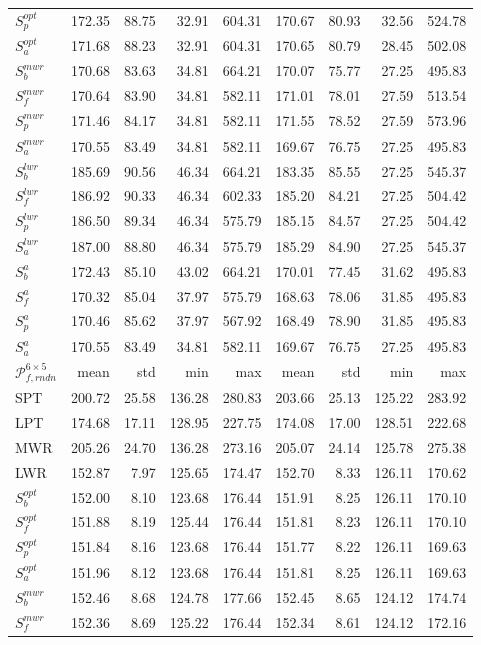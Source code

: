 {\begin{table}
{\begin{tabular}{|l|rrrr|rrrr|}
$S^{opt}_p$ &172.35&88.75&32.91&604.31&170.67&80.93&32.56&524.78\\
$S^{opt}_a$ &171.68&88.23&32.91&604.31&170.65&80.79&28.45&502.08\\
$S^{mwr}_b$ &170.68&83.63&34.81&664.21&170.07&75.77&27.25&495.83\\
$S^{mwr}_f$ &170.64&83.90&34.81&582.11&171.01&78.01&27.59&513.54\\
$S^{mwr}_p$ &171.46&84.17&34.81&582.11&171.55&78.52&27.59&573.96\\
$S^{mwr}_a$ &170.55&83.49&34.81&582.11&169.67&76.75&27.25&495.83\\
$S^{lwr}_b$ &185.69&90.56&46.34&664.21&183.35&85.55&27.25&545.37\\
$S^{lwr}_f$ &186.92&90.33&46.34&602.33&185.20&84.21&27.25&504.42\\
$S^{lwr}_p$ &186.50&89.34&46.34&575.79&185.15&84.57&27.25&504.42\\
$S^{lwr}_a$ &187.00&88.80&46.34&575.79&185.29&84.90&27.25&545.37\\
$S^{a}_b$ &172.43&85.10&43.02&664.21&170.01&77.45&31.62&495.83\\
$S^{a}_f$ &170.32&85.04&37.97&575.79&168.63&78.06&31.85&495.83\\
$S^{a}_p$ &170.46&85.62&37.97&567.92&168.49&78.90&31.85&495.83\\
$S^{a}_a$ &170.55&83.49&34.81&582.11&169.67&76.75&27.25&495.83\\
\hline
$\mathcal{P}^{6\times5}_{f,rndn}$ & mean & std & min & max & mean & std & min & max \\
\hline
SPT &200.72&25.58&136.28&280.83&203.66&25.13&125.22&283.92\\
LPT &174.68&17.11&128.95&227.75&174.08&17.00&128.51&222.68\\
MWR &205.26&24.70&136.28&273.16&205.07&24.14&125.78&275.38\\
LWR &152.87&7.97&125.65&174.47&152.70&8.33&126.11&170.62\\
$S^{opt}_b$ &152.00&8.10&123.68&176.44&151.91&8.25&126.11&170.10\\
$S^{opt}_f$ &151.88&8.19&125.44&176.44&151.81&8.23&126.11&170.10\\
$S^{opt}_p$ &151.84&8.16&123.68&176.44&151.77&8.22&126.11&169.63\\
$S^{opt}_a$ &151.96&8.12&123.68&176.44&151.81&8.25&126.11&169.63\\
$S^{mwr}_b$ &152.46&8.68&124.78&177.66&152.45&8.65&124.12&174.74\\
$S^{mwr}_f$ &152.36&8.69&125.22&176.44&152.34&8.61&124.12&172.16\\

\end{tabular}}
\end{table}}
